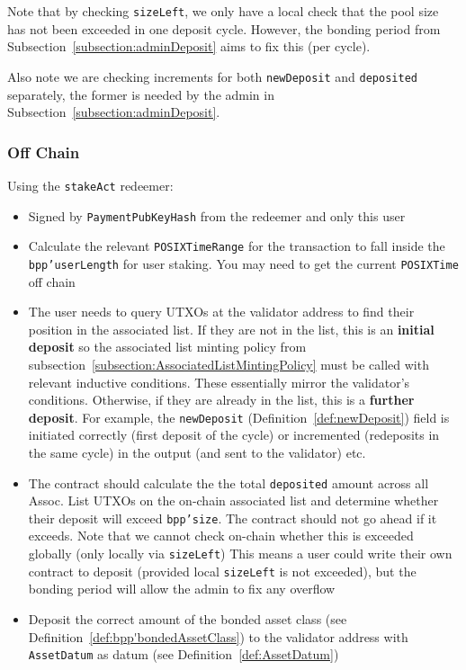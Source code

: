 \documentclass[10pt, a4paper]{article}
\theoremstyle{definition}
\begin{document}
Note that by checking \texttt{sizeLeft}, we only have a local check that the pool size has not been exceeded in one deposit cycle. However, the bonding period from Subsection~\ref{subsection:adminDeposit} aims to fix this (per cycle).

Also note we are checking increments for both \texttt{newDeposit} and \texttt{deposited} separately, the former is needed by the admin in Subsection~\ref{subsection:adminDeposit}.
\subsubsection{Off Chain}\label{subsubsection:userStakeOffchain}
Using the \texttt{stakeAct} redeemer:
\begin{itemize}
\item{Signed by \texttt{PaymentPubKeyHash} from the redeemer and only this user}
\item{Calculate the relevant \texttt{POSIXTimeRange} for the transaction to fall inside the \texttt{bpp'userLength} for user staking. You may need to get the current \texttt{POSIXTime} off chain}
\item{The user needs to query UTXOs at the validator address to find their position in the associated list. If they are not in the list, this is an \textbf{initial deposit} so the associated list minting policy from subsection~\ref{subsection:AssociatedListMintingPolicy} must be called with relevant inductive conditions. These essentially mirror the validator's conditions. Otherwise, if they are already in the list, this is a \textbf{further deposit}. For example, the \texttt{newDeposit} (Definition~\ref{def:newDeposit}) field is initiated correctly (first deposit of the cycle) or incremented (redeposits in the same cycle) in the output (and sent to the validator) etc.}
\item{The contract should calculate the the total \texttt{deposited} amount across all Assoc. List UTXOs on the on-chain associated list and determine whether their deposit will exceed \texttt{bpp'size}. The contract should not go ahead if it exceeds. Note that we cannot check on-chain whether this is exceeded globally (only locally via \texttt{sizeLeft}) This means a user could write their own contract to deposit (provided local \texttt{sizeLeft} is not exceeded), but the bonding period will allow the admin to fix any overflow}
\item{Deposit the correct amount of the bonded asset class (see Definition~\ref{def:bpp'bondedAssetClass}) to the validator address with \texttt{AssetDatum} as datum (see Definition~\ref{def:AssetDatum})}
\end{itemize}
\end{document}
